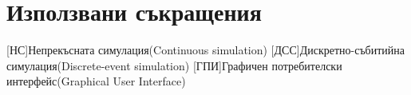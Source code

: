 \appendix
\chapter{Използвани съкращения}
	\begin{acronym}[JDK]
		[НС]{Непрекъсната симулация(Continuous simulation)}
		[ДСС]{Дискретно-събитийна симулация(Discrete-event simulation)}
		[ГПИ]{Графичен потребителски интерфейс(Graphical User Interface)}
	\end{acronym}